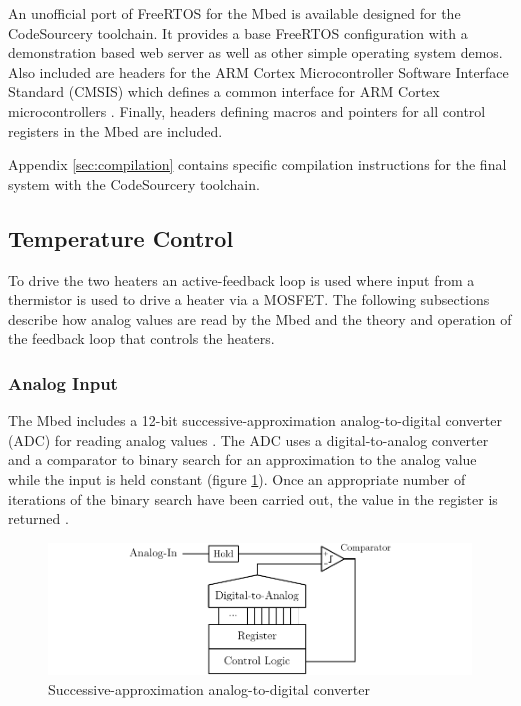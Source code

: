 			An unofficial port of FreeRTOS for the Mbed is available designed for the
			CodeSourcery toolchain. It provides a base FreeRTOS configuration with a
			demonstration \uIP{} based web server as well as other simple operating
			system demos. Also included are headers for the ARM Cortex Microcontroller
			Software Interface Standard (CMSIS) which defines a common interface for
			ARM Cortex microcontrollers \cite{cmsis}. Finally, headers defining macros
			and pointers for all control registers in the Mbed are included.
			
			Appendix \ref{sec:compilation} contains specific compilation instructions
			for the final system with the CodeSourcery toolchain.
		
		\subsection{Temperature Control}
			
			To drive the two heaters an active-feedback loop is used where input from
			a thermistor is used to drive a heater via a MOSFET. The following
			subsections describe how analog values are read by the Mbed and the theory
			and operation of the feedback loop that controls the heaters.
			
			\subsubsection{Analog Input}
				
				The Mbed includes a 12-bit successive-approximation analog-to-digital
				converter (ADC) for reading analog values \cite{lpc1768}. The ADC uses a
				digital-to-analog converter and a comparator to binary search for an
				approximation to the analog value while the input is held constant
				(figure \ref{fig:adc}). Once an appropriate
				number of iterations of the binary search have been carried out, the
				value in the register is returned \cite{maximadc}.
				
				\begin{figure}
					\includegraphics[width=1\textwidth]{diagrams/adc.pdf}
					\caption{Successive-approximation analog-to-digital converter}
					\label{fig:adc}
				\end{figure}
				
